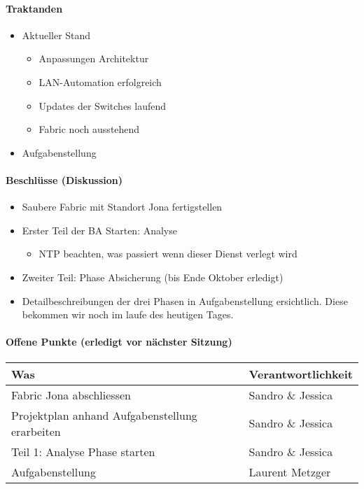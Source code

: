 \paragraph{Traktanden}
\begin{itemize}	
	\item Aktueller Stand 
	\begin{itemize}
		\item Anpassungen Architektur
		\item LAN-Automation erfolgreich
		\item Updates der Switches laufend
		\item Fabric noch ausstehend
	\end{itemize}
	\item Aufgabenstellung	
\end{itemize}

\paragraph{Beschlüsse (Diskussion)}
\begin{itemize}	
	\item Saubere Fabric mit Standort Jona fertigstellen
	\item Erster Teil der BA Starten: Analyse
	\begin{itemize}
		\item NTP beachten, was passiert wenn dieser Dienst verlegt wird
	\end{itemize}
	\item Zweiter Teil: Phase Absicherung (bis Ende Oktober erledigt)
	\item Detailbeschreibungen der drei Phasen in Aufgabenstellung ersichtlich. Diese bekommen wir noch im laufe des heutigen Tages.
\end{itemize}

\paragraph{Offene Punkte (erledigt vor nächster Sitzung)} \mbox{}
\begin{table}[H]
	\centering
	\begin{tabularx}{\textwidth}{X | p{4.5cm}}
		\rowcolor{gray!50}
		\textbf{Was} & \textbf{Verantwortlichkeit} \\
		\hline	
		Fabric Jona abschliessen & Sandro \& Jessica \\
		Projektplan anhand Aufgabenstellung erarbeiten & Sandro \& Jessica \\
		Teil 1: Analyse Phase starten & Sandro \& Jessica \\
		Aufgabenstellung & Laurent Metzger \\
	\end{tabularx}
	\label{tab:my-label}
\end{table}

